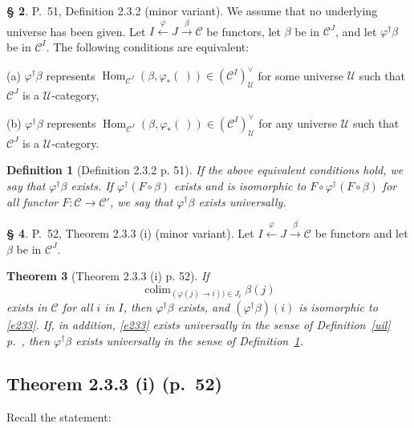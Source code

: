 \documentclass[12pt]{article}%
\newtheorem{thm}{Theorem}%
\newtheorem{df}[thm]{Definition}%
\theoremstyle{remark}
\theoremstyle{definition}
\newtheorem{s}[thm]{\S}%
\newcommand{\nn}{\noindent}
\newcommand{\C}{\mathcal C}
\newcommand{\U}{\mathcal U}
\newcommand{\pp}{\varphi}
\newcommand{\xr}{\xrightarrow}
\DeclareMathOperator*{\colim}{colim}
\DeclareMathOperator{\Hom}{Hom}%
\begin{document}
\begin{s} 
P.~51, Definition 2.3.2 (minor variant). We assume that no underlying universe has been given. Let $I\xleftarrow\pp J\xr\beta\C$ be functors, let $\beta$ be in $\C^J$, and let $\pp^\dagger\beta$ be in $\C^I$. The following conditions are equivalent:

\nn(a) $\pp^\dagger\beta$ represents $\Hom_{\C^J}(\beta,\pp_*(\ ))\in(\C^I)^\vee_\U$ for some universe $\U$ such that $\C^J$ is a $\U$-category,

\nn(b) $\pp^\dagger\beta$ represents $\Hom_{\C^J}(\beta,\pp_*(\ ))\in(\C^I)^\vee_\U$ for any universe $\U$ such that $\C^J$ is a $\U$-category. 

\begin{df}[Definition 2.3.2 p. 51]\label{232}
If the above equivalent conditions hold, we say that $\pp^\dagger\beta$ {\em exists}. If $\pp^\dagger(F\circ\beta)$ exists and is isomorphic to $F\circ\pp^\dagger(F\circ\beta)$ for all functor $F:\C\to\C'$, we say that $\pp^\dagger\beta$ exists {\em universally}.
\end{df}
\end{s}

%

\begin{s} 
P.~52, Theorem 2.3.3 (i) (minor variant). Let $I\xleftarrow\pp J\xr\beta\C$ be functors and let $\beta$ be in $\C^J$. 

\begin{thm}[Theorem 2.3.3 (i) p. 52]\label{233}
If 
%
\begin{equation}\label{e233}
\colim_{(\pp(j)\to i))\in J_i}\beta(j)
\end{equation}
%
exists in $\C$ for all $i$ in $I$, then $\pp^\dagger\beta$ exists, and $(\pp^\dagger\beta)(i)$ is isomorphic to \eqref{e233}. If, in addition, \eqref{e233} exists universally in the sense of Definition~\ref{uil} p.~\pageref{uil}, then $\pp^\dagger\beta$ exists universally in the sense of Definition~\ref{232}. 
\end{thm}
\end{s}


\subsection{Theorem 2.3.3 (i) (p.~52)}

Recall the statement: 
\end{document}
